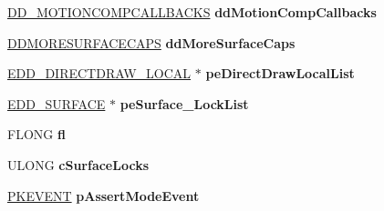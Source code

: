 \begin{DoxyCompactItemize}
\item 
\mbox{\label{struct___e_d_d___d_i_r_e_c_t_d_r_a_w___g_l_o_b_a_l_a746815291ce5aab6f51a8fe7d4ae5645}} 
\hyperlink{struct_d_d___m_o_t_i_o_n_c_o_m_p_c_a_l_l_b_a_c_k_s}{D\+D\+\_\+\+M\+O\+T\+I\+O\+N\+C\+O\+M\+P\+C\+A\+L\+L\+B\+A\+C\+KS} {\bfseries dd\+Motion\+Comp\+Callbacks}
\item 
\mbox{\label{struct___e_d_d___d_i_r_e_c_t_d_r_a_w___g_l_o_b_a_l_ab8bf142d66f2bbe971b90905fe350eb0}} 
\hyperlink{struct___d_d_m_o_r_e_s_u_r_f_a_c_e_c_a_p_s}{D\+D\+M\+O\+R\+E\+S\+U\+R\+F\+A\+C\+E\+C\+A\+PS} {\bfseries dd\+More\+Surface\+Caps}
\item 
\mbox{\label{struct___e_d_d___d_i_r_e_c_t_d_r_a_w___g_l_o_b_a_l_ae1e4b3190ece32588aed27e6fb94dc53}} 
\hyperlink{struct___e_d_d___d_i_r_e_c_t_d_r_a_w___l_o_c_a_l}{E\+D\+D\+\_\+\+D\+I\+R\+E\+C\+T\+D\+R\+A\+W\+\_\+\+L\+O\+C\+AL} $\ast$ {\bfseries pe\+Direct\+Draw\+Local\+List}
\item 
\mbox{\label{struct___e_d_d___d_i_r_e_c_t_d_r_a_w___g_l_o_b_a_l_aba1a8e4a6fc733fa65df5c353eb8ef15}} 
\hyperlink{struct___e_d_d___s_u_r_f_a_c_e}{E\+D\+D\+\_\+\+S\+U\+R\+F\+A\+CE} $\ast$ {\bfseries pe\+Surface\+\_\+\+Lock\+List}
\item 
\mbox{\label{struct___e_d_d___d_i_r_e_c_t_d_r_a_w___g_l_o_b_a_l_a3694ddeb5655e1f0f04e1cf067931a63}} 
F\+L\+O\+NG {\bfseries fl}
\item 
\mbox{\label{struct___e_d_d___d_i_r_e_c_t_d_r_a_w___g_l_o_b_a_l_a6f99f62cdeb032804ad34731a3167b68}} 
U\+L\+O\+NG {\bfseries c\+Surface\+Locks}
\item 
\mbox{\label{struct___e_d_d___d_i_r_e_c_t_d_r_a_w___g_l_o_b_a_l_a81f5f229b82d617a764875fb8e0fb94c}} 
\hyperlink{struct___k_e_v_e_n_t}{P\+K\+E\+V\+E\+NT} {\bfseries p\+Assert\+Mode\+Event}
\item 
\mbox{\label{struct___e_d_d___d_i_r_e_c_t_d_r_a_w___g_l_o_b_a_l_a00648bab8e8b6c39d3cb0de131763a88}} 

\end{DoxyCompactItemize}

